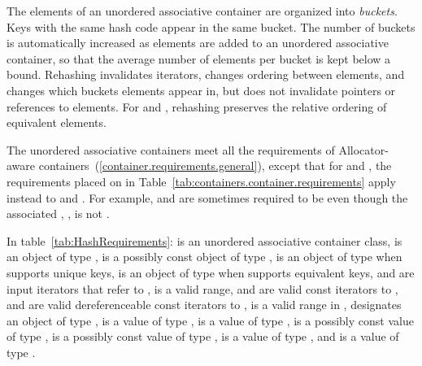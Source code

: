 \pnum
{}%
%
The elements of an unordered associative container are organized into
\textit{buckets}.  Keys with the same hash code appear in the same
bucket.  The number of buckets is automatically increased as elements
are added to an unordered associative container, so that the average
number of elements per bucket is kept below a bound.  Rehashing
invalidates iterators, changes ordering between elements, and changes
which buckets elements appear in, but does not invalidate pointers or
references to elements. For  and
, rehashing preserves the relative ordering of
equivalent elements.

\pnum
The unordered associative containers meet all the requirements of Allocator-aware
containers~(\ref{container.requirements.general}), except that for
 and , the requirements placed on 
in Table~\ref{tab:containers.container.requirements} apply instead to 
and . \enternote For example,  and 
are sometimes required to be  even though the associated
, , is not
. \exitnote

\pnum
{}%
%
%
%
%
%
In table~\ref{tab:HashRequirements}:
 is an unordered associative container class,  is an
object of type ,  is a possibly const object of
type ,  is an object of type 
when  supports unique keys,  is an object of
type  when  supports equivalent keys, 
and  are input iterators that refer
to , \tcode{[i, j)} is a valid range,
 and  are valid const iterators to ,
 and  are valid dereferenceable const iterators to ,
\tcode{[q1, q2)} is a valid range in ,
 designates an object of type ,
 is a value of
type ,  is a value of
type ,  is a possibly const value of
type ,  is a possibly const value of
type ,  is a value of
type , and  is a value of
type .

